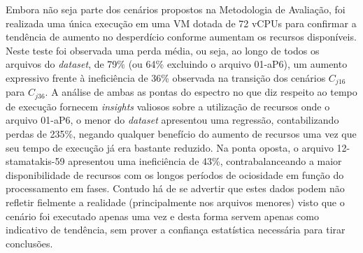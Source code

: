 \documentclass[english,brazilian]{UNISINOSmonografia} %
\begin{document}
Embora não seja parte dos cenários propostos na Metodologia de Avaliação, foi realizada uma única execução em uma VM dotada de 72 vCPUs para confirmar a tendência de aumento no desperdício conforme aumentam os recursos disponíveis.
%
Neste teste foi observada uma perda média, ou seja, ao longo de todos os arquivos do \textit{dataset}, de 79\% (ou 64\% excluindo o arquivo 01-aP6), um aumento expressivo frente à ineficiência de 36\% observada na transição dos cenários $C_{j16}$ para $C_{j36}$.
%
A análise de ambas as pontas do espectro no que diz respeito ao tempo de execução fornecem \textit{insights} valiosos sobre a utilização de recursos onde o arquivo 01-aP6, o menor do \textit{dataset} apresentou uma regressão, contabilizando perdas de 235\%, negando qualquer benefício do aumento de recursos uma vez que seu tempo de execução já era bastante reduzido.
%
Na ponta oposta, o arquivo 12-stamatakis-59 apresentou uma ineficiência de 43\%, contrabalanceando a maior disponibilidade de recursos com os longos períodos de ociosidade em função do processamento em fases.
%
Contudo há de se advertir que estes dados podem não refletir fielmente a realidade (principalmente nos arquivos menores) visto que o cenário foi executado apenas uma vez e desta forma servem apenas como indicativo de tendência, sem prover a confiança estatística necessária para tirar conclusões.
\end{document}
